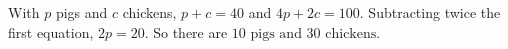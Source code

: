 With $p$ pigs and $c$ chickens, $p+c=40$ and $4p+2c=100$. Subtracting twice the first equation, $2p=20$. So there are $\boxed{10\text{ pigs and }30\text{ chickens}}$.
